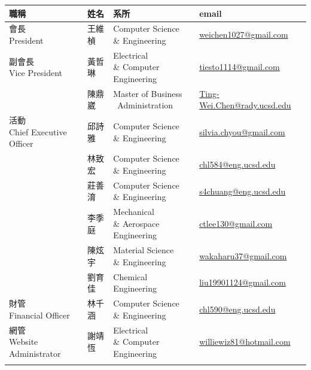 \documentclass[10pt,a4paper]{book}
\begin{document}
\begin{CJK}{UTF8}{bkai}
{
\setlength\extrarowheight{0.3cm}
\small
\begin{center}
\begin{tabular}{l l p{4cm} l}
\hline
職稱 & 姓名 & 系所 & email\\
\hline

\parbox[t]{3.4cm}{會長\\President} & 王維楨 & \parbox[t]{4cm}{Computer Science \\\& Engineering} & \url{weichen1027@gmail.com} \\


\parbox[t]{3.4cm}{副會長\\Vice President} & 黃哲琳 & \parbox[t]{4cm}{Electrical\\\& Computer Engineering} & \url{tiesto1114@gmail.com} \\
 & 陳鼎崴 & \parbox[t]{4cm}{Master of Business \\\ Administration} & \url{Ting-Wei.Chen@rady.ucsd.edu} \\


\parbox[t]{3.4cm}{活動\\Chief Executive Officer} & 邱詩雅 & \parbox[t]{4cm}{Computer Science\\\& Engineering}& \url{silvia.chyou@gmail.com}\\
& 林致宏 & \parbox[t]{4cm}{Computer Science\\\& Engineering} & \url{chl584@eng.ucsd.edu}\\
& 莊善淯 & \parbox[t]{4cm}{Computer Science\\\& Engineering} & \url{s4chuang@eng.ucsd.edu}\\
& 李季庭 & \parbox[t]{4cm}{Mechanical \\\& Aerospace Engineering} & \url{ctlee130@gmail.com}\\
& 陳炫宇 & \parbox[t]{4cm}{Material Science \\\& Engineering} & \url{wakaharu37@gmail.com}\\
& 劉育佳 & \parbox[t]{4cm}{Chemical Engineering} & \url{liu19901124@gmail.com}\\



\parbox[t]{3.4cm}{財管\\Financial Officer} & 林千涵 & \parbox[t]{4cm}{Computer Science\\\& Engineering}& \url{chl590@eng.ucsd.edu}\\


\parbox[t]{3.4cm}{網管\\Website Administrator} & 謝靖恆 & \parbox[t]{4cm}{Electrical\\\& Computer Engineering} & \url{williewiz81@hotmail.com}\\
\\


\end{tabular}
\end{center}}
\end{CJK}
\end{document}
